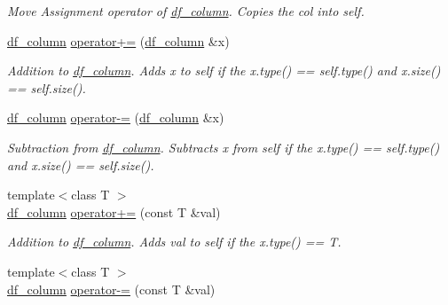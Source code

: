 \begin{DoxyCompactItemize}
\begin{DoxyCompactList}\small\item\em Move Assignment operator of \hyperlink{classboost_1_1numeric_1_1ublas_1_1df__column}{df\+\_\+column}. Copies the col into self. \end{DoxyCompactList}\item 
\hyperlink{classboost_1_1numeric_1_1ublas_1_1df__column}{df\+\_\+column} \hyperlink{classboost_1_1numeric_1_1ublas_1_1df__column_a07f20e236c022eebc286468ef8653fe7}{operator+=} (\hyperlink{classboost_1_1numeric_1_1ublas_1_1df__column}{df\+\_\+column} \&x)
\begin{DoxyCompactList}\small\item\em Addition to \hyperlink{classboost_1_1numeric_1_1ublas_1_1df__column}{df\+\_\+column}. Adds x to self if the {\ttfamily x.\+type()} == {\ttfamily self.\+type()} and {\ttfamily x.\+size()} == {\ttfamily self.\+size()}. \end{DoxyCompactList}\item 
\hyperlink{classboost_1_1numeric_1_1ublas_1_1df__column}{df\+\_\+column} \hyperlink{classboost_1_1numeric_1_1ublas_1_1df__column_adfbc15a4704852ab8b8cafea6f331d36}{operator-\/=} (\hyperlink{classboost_1_1numeric_1_1ublas_1_1df__column}{df\+\_\+column} \&x)
\begin{DoxyCompactList}\small\item\em Subtraction from \hyperlink{classboost_1_1numeric_1_1ublas_1_1df__column}{df\+\_\+column}. Subtracts x from self if the {\ttfamily x.\+type()} == {\ttfamily self.\+type()} and {\ttfamily x.\+size()} == {\ttfamily self.\+size()}. \end{DoxyCompactList}\item 
{\footnotesize template$<$class T $>$ }\\\hyperlink{classboost_1_1numeric_1_1ublas_1_1df__column}{df\+\_\+column} \hyperlink{classboost_1_1numeric_1_1ublas_1_1df__column_ae0ea24e50a5b0bab6a1769843e4e8a31}{operator+=} (const T \&val)
\begin{DoxyCompactList}\small\item\em Addition to \hyperlink{classboost_1_1numeric_1_1ublas_1_1df__column}{df\+\_\+column}. Adds val to self if the {\ttfamily x.\+type()} == T. \end{DoxyCompactList}\item 
{\footnotesize template$<$class T $>$ }\\\hyperlink{classboost_1_1numeric_1_1ublas_1_1df__column}{df\+\_\+column} \hyperlink{classboost_1_1numeric_1_1ublas_1_1df__column_af1538077a1e758cd91af28532fba2e12}{operator-\/=} (const T \&val)

\end{DoxyCompactItemize}
